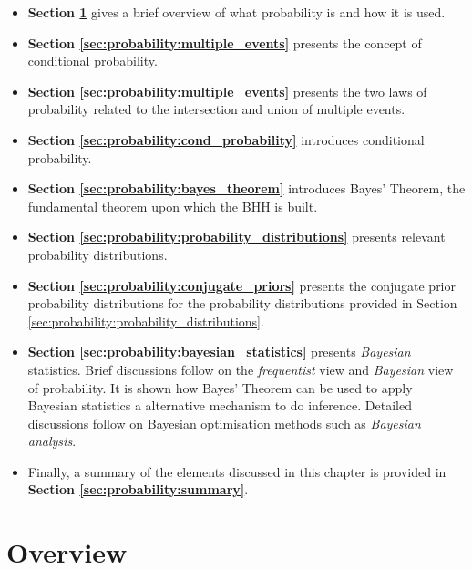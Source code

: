 \begin{itemize}
      \item \textbf{Section \ref{sec:probability:overview}} gives a brief overview of what probability is and how it is used.

      \item \textbf{Section \ref{sec:probability:multiple_events}} presents the concept of conditional probability.

      \item \textbf{Section \ref{sec:probability:multiple_events}} presents the two laws of probability related to the intersection and union of multiple events.

      \item \textbf{Section \ref{sec:probability:cond_probability}} introduces conditional probability.

      \item \textbf{Section \ref{sec:probability:bayes_theorem}} introduces Bayes' Theorem, the fundamental theorem upon which the \ac{BHH} is built.

      \item \textbf{Section \ref{sec:probability:probability_distributions}} presents relevant probability distributions.

      \item \textbf{Section \ref{sec:probability:conjugate_priors}} presents the conjugate prior probability distributions for the probability distributions provided in Section \ref{sec:probability:probability_distributions}.

      \item \textbf{Section \ref{sec:probability:bayesian_statistics}} presents \textit{Bayesian} statistics. Brief discussions follow on the \textit{frequentist} view and \textit{Bayesian} view of probability. It is shown how Bayes' Theorem can be used to apply Bayesian statistics a alternative mechanism to do inference. Detailed discussions follow on Bayesian optimisation methods such as \textit{Bayesian analysis}.

      \item Finally, a summary of the elements discussed in this chapter is provided in \textbf{Section \ref{sec:probability:summary}}.
\end{itemize}




\section{Overview}
\label{sec:probability:overview}


